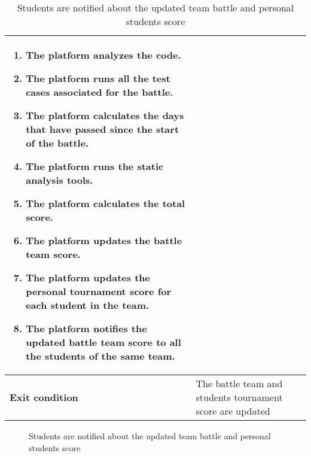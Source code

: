 \begin{enumerate}[label=\textbf{UC\arabic*}:,ref=UC\arabic*,leftmargin=1.3cm]
{\begin{table}[H]
\begin{tabular}{|l|p{11.9cm}|}
\begin{enumerate}[label=\arabic*.]
                              \item The platform analyzes the code.
                              \item The platform runs all the test cases associated for the battle.
                              \item The platform calculates the days that have passed since the start of the battle.
                              \item The platform runs the static analysis tools.
                              \item The platform calculates the total score.
                              \item The platform updates the battle team score.
                              \item The platform updates the personal tournament score for each student in the team.
                              \item The platform notifies the updated battle team score to all the students of the same team.
                        \end{enumerate}                                                       \\\hline
                        \textbf{Exit condition}  & The battle team and students tournament score are updated                                                                                    \\\hline
                  \end{tabular}
                  \caption{Students are notified about the updated team battle and personal students score}
                  \label{table:Students are notified about the updated team battle and personal students score}
            \end{table}
            \begin{figure}[H]
                  \centering
                  \caption{Students are notified about the updated team battle and personal students score}
                  \label{fig:Students are notified about the updated team battle and personal students score}
            \end{figure}
            \pagebreak
      }
\end{enumerate}
